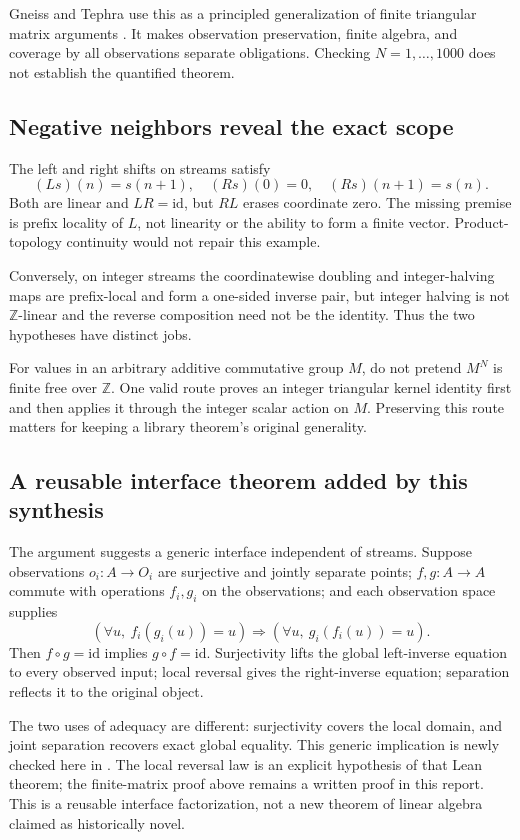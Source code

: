 \documentclass[11pt,letterpaper]{article}
\newcommand{\code}[1]{\texttt{\detokenize{#1}}}
\newcommand{\Z}{\mathbb Z}\newcommand{\N}{\mathbb N}
\newcommand{\id}{\mathrm{id}}
\theoremstyle{definition}\newtheorem{definition}[proposition]{Definition}
\theoremstyle{remark}\newtheorem{remark}[proposition]{Remark}
\begin{document}
Gneiss and Tephra use this as a principled generalization of finite triangular
matrix arguments \cite{gneiss,tephra}. It makes observation preservation,
finite algebra, and coverage by all observations separate obligations. Checking
$N=1,\ldots,1000$ does not establish the quantified theorem.

\subsection{Negative neighbors reveal the exact scope}
The left and right shifts on streams satisfy
\[
 (Ls)(n)=s(n+1),\quad (Rs)(0)=0,\quad (Rs)(n+1)=s(n).
\]
Both are linear and $LR=\id$, but $RL$ erases coordinate zero. The missing
premise is prefix locality of $L$, not linearity or the ability to form a finite
vector. Product-topology continuity would not repair this example.

Conversely, on integer streams the coordinatewise doubling and integer-halving
maps are prefix-local and form a one-sided inverse pair, but integer halving
is not $\Z$-linear and the reverse composition need not be the identity.
Thus the two hypotheses have distinct jobs.

For values in an arbitrary additive commutative group $M$, do not pretend
$M^N$ is finite free over $\Z$. One valid route proves an integer triangular
kernel identity first and then applies it through the integer scalar action
on $M$. Preserving this route matters for keeping a library theorem's original
generality.

\subsection{A reusable interface theorem added by this synthesis}
The argument suggests a generic interface independent of streams. Suppose
observations $o_i:A\to O_i$ are surjective and jointly separate points;
$f,g:A\to A$ commute with operations $f_i,g_i$ on the observations; and each
observation space supplies
\[
 (\forall u,\ f_i(g_i(u))=u)
 \Longrightarrow(\forall u,\ g_i(f_i(u))=u).
\]
Then $f\circ g=\id$ implies $g\circ f=\id$.
Surjectivity lifts the global left-inverse equation to every observed input;
local reversal gives the right-inverse equation; separation reflects it to
the original object.

The two uses of adequacy are different: surjectivity covers the local domain,
and joint separation recovers exact global equality. This generic implication
is newly checked here in \code{reverse_via_observations}. The local reversal
law is an explicit hypothesis of that Lean theorem; the finite-matrix proof
above remains a written proof in this report. This is a reusable interface
factorization, not a new theorem of linear algebra claimed as historically novel.
\end{document}
